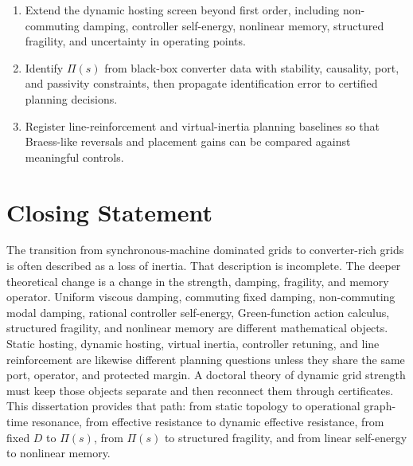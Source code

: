 \begin{enumerate}
tracking so that local pole-motion maps can be followed through high-dimensional
hosting and controller-retuning sweeps.
\item Extend the dynamic hosting screen beyond first order, including
non-commuting damping, controller self-energy, nonlinear memory, structured
fragility, and uncertainty in operating points.
\item Identify \(\Pi(s)\) from black-box converter data with stability,
causality, port, and passivity constraints, then propagate identification
error to certified planning decisions.
\item Register line-reinforcement and virtual-inertia planning baselines so
that Braess-like reversals and placement gains can be compared against
meaningful controls.
\end{enumerate}

\section{Closing Statement}

The transition from synchronous-machine dominated grids to converter-rich
grids is often described as a loss of inertia. That description is incomplete.
The deeper theoretical change is a change in the strength, damping, fragility,
and memory operator. Uniform viscous damping, commuting fixed damping,
non-commuting modal damping, rational controller self-energy, Green-function
action calculus, structured fragility, and nonlinear memory are different
mathematical objects. Static hosting, dynamic hosting, virtual inertia,
controller retuning, and line reinforcement are likewise different planning
questions unless they share the same port, operator, and protected margin. A
doctoral theory of dynamic grid strength must keep those objects separate and
then reconnect them through certificates. This dissertation provides that path:
from static topology to operational graph-time resonance, from effective
resistance to dynamic effective resistance, from fixed \(D\) to \(\Pi(s)\),
from \(\Pi(s)\) to structured fragility, and from linear self-energy to
nonlinear memory.
